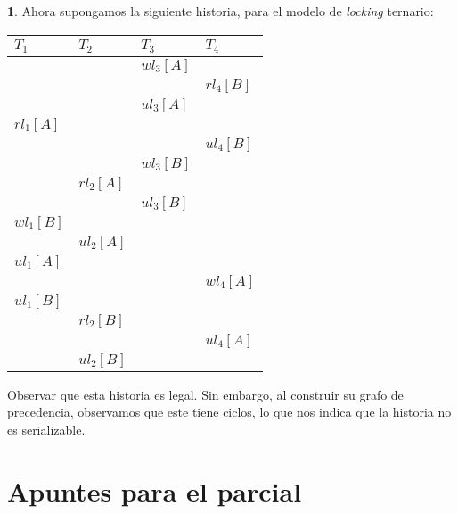 \documentclass[english]{article}
\theoremstyle{definition}
\theoremstyle{definition}
\newtheorem{example}[thm]{\protect\examplename}
\providecommand{\examplename}{Ejemplo}
\begin{document}
\begin{example}
Ahora supongamos la siguiente historia, para el modelo de \emph{locking}
ternario:

\vspace{10pt}

\begin{tabular}{ l l l l }
  $T_1$         & $T_2$     & $T_3$     & $T_4$     \\
  \hline
                &           & $wl_3[A]$ &           \\
                &           &           & $rl_4[B]$ \\
                &           & $ul_3[A]$ &           \\
  $rl_1[A]$     &           &           &           \\
                &           &           & $ul_4[B]$ \\
                &           & $wl_3[B]$ &           \\
                & $rl_2[A]$ &           &           \\
                &           & $ul_3[B]$ &           \\
  $wl_1[B]$     &           &           &           \\
                & $ul_2[A]$ &           &           \\
  $ul_1[A]$     &           &           &           \\
                &           &           & $wl_4[A]$ \\
  $ul_1[B]$     &           &           &           \\
                & $rl_2[B]$ &           &           \\
                &           &           & $ul_4[A]$ \\
                & $ul_2[B]$ &           &           \\
  \hline
\end{tabular}

\vspace{10pt}

Observar que esta historia es legal. Sin embargo, al construir su grafo de
precedencia, observamos que este tiene ciclos, lo que nos indica que la
historia no es serializable.
\end{example}


\newpage

\section{Apuntes para el parcial}
\end{document}
